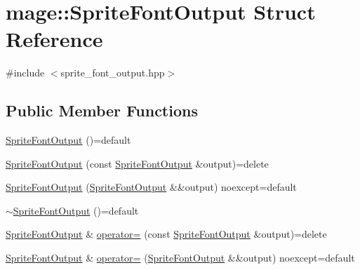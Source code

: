 \hypertarget{structmage_1_1_sprite_font_output}{}\section{mage\+:\+:Sprite\+Font\+Output Struct Reference}
\label{structmage_1_1_sprite_font_output}


{\ttfamily \#include $<$sprite\+\_\+font\+\_\+output.\+hpp$>$}

\subsection*{Public Member Functions}
\begin{DoxyCompactItemize}
\item 
\hyperlink{structmage_1_1_sprite_font_output_a91ed0cd4cb7f9bfab57ff0e3fa4436bc}{Sprite\+Font\+Output} ()=default
\item 
\hyperlink{structmage_1_1_sprite_font_output_a02ea4f9574bce22b4f0f32b78b6b3b79}{Sprite\+Font\+Output} (const \hyperlink{structmage_1_1_sprite_font_output}{Sprite\+Font\+Output} \&output)=delete
\item 
\hyperlink{structmage_1_1_sprite_font_output_aed4a4a96c9c767060710cb259d7fa2e9}{Sprite\+Font\+Output} (\hyperlink{structmage_1_1_sprite_font_output}{Sprite\+Font\+Output} \&\&output) noexcept=default
\item 
\hyperlink{structmage_1_1_sprite_font_output_ab0793582b679667ff018eda962b77f6a}{$\sim$\+Sprite\+Font\+Output} ()=default
\item 
\hyperlink{structmage_1_1_sprite_font_output}{Sprite\+Font\+Output} \& \hyperlink{structmage_1_1_sprite_font_output_a1eeb719ec5e2e8f84f51fc9c5db228f7}{operator=} (const \hyperlink{structmage_1_1_sprite_font_output}{Sprite\+Font\+Output} \&output)=delete
\item 
\hyperlink{structmage_1_1_sprite_font_output}{Sprite\+Font\+Output} \& \hyperlink{structmage_1_1_sprite_font_output_a5311924679dbfeaf297a6c542f436886}{operator=} (\hyperlink{structmage_1_1_sprite_font_output}{Sprite\+Font\+Output} \&\&output) noexcept=default
\end{DoxyCompactItemize}
